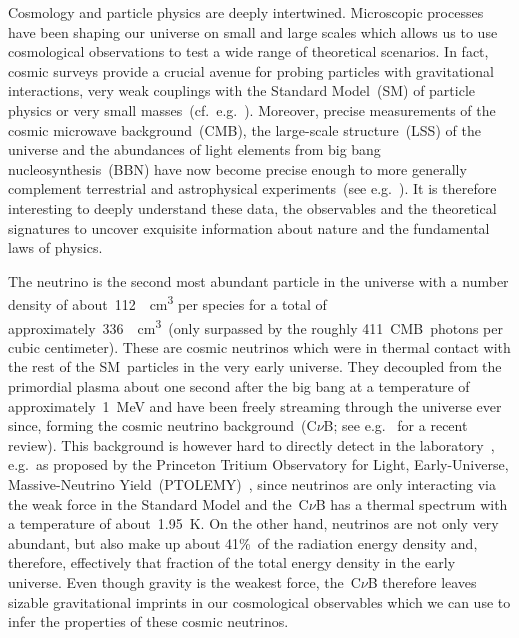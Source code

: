 \documentclass[11pt]{article}
\numberwithin{equation}{section}
\begin{document}
Cosmology and particle physics are deeply intertwined. Microscopic processes have been shaping our universe on small and large scales which allows us to use cosmological observations to test a wide range of theoretical scenarios. In fact, cosmic surveys provide a crucial avenue for probing particles with gravitational interactions, very weak couplings with the Standard Model~(SM) of particle physics or very small masses~(cf.~e.g.~\cite{Flauger:2022hie, Amin:2022soj, Green:2022hhj}). Moreover, precise measurements of the cosmic microwave background~(CMB), the large-scale structure~(LSS) of the universe and the abundances of light elements from big bang nucleosynthesis~(BBN) have now become precise enough to more generally complement terrestrial and astrophysical experiments~(see e.g.~\cite{Annis:2022xgg, Chang:2022lrw}). It is therefore interesting to deeply understand these data, the observables and the theoretical signatures to uncover exquisite information about nature and the fundamental laws of physics.\medskip

The neutrino is the second most abundant particle in the universe with a number density of about~\SI{112}{\per\centi\meter\cubed} per species for a total of approximately~\SI{336}{\per\centi\meter\cubed}~(only surpassed by the roughly 411~CMB~photons per cubic centimeter). These are cosmic neutrinos which were in thermal contact with the rest of the SM~particles in the very early universe. They decoupled from the primordial plasma about one second after the big bang at a temperature of approximately~\SI{1}{\mega\electronvolt} and have been freely streaming through the universe ever since, forming the cosmic neutrino background~(C$\nu$B; see e.g.~\cite{Scott:2024rwc} for a recent review). This background is however hard to directly detect in the laboratory~\cite{Bauer:2022lri}, e.g.\ as proposed by the Princeton Tritium Observatory for Light, Early-Universe, Massive-Neutrino Yield~(PTOLEMY)~\cite{PTOLEMY:2019hkd}, since neutrinos are only interacting via the weak force in the Standard Model and the~C$\nu$B has a thermal spectrum with a temperature of about~\SI{1.95}{\kelvin}. On the other hand, neutrinos are not only very abundant, but also make up about 41\%~of the radiation energy density and, therefore, effectively that fraction of the total energy density in the early universe. Even though gravity is the weakest force, the~C$\nu$B therefore leaves sizable gravitational imprints in our cosmological observables which we can use to infer the properties of these cosmic neutrinos.\medskip
\end{document}
